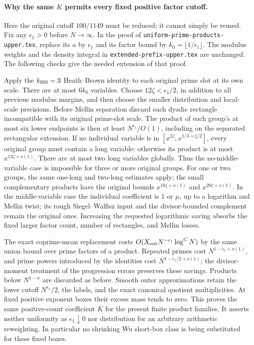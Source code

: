 \paragraph{Why the same $K$ permits every fixed positive factor cutoff.}
Here the original cutoff $100/1149$ must be reduced; it cannot simply
be reused. Fix any $\epsilon_1>0$ before $N\to\infty$. In the proof of
\texttt{uniform-prime-products-upper.tex}, replace its $a$ by
$\epsilon_1$ and its factor bound by $k_0=\lfloor1/\epsilon_1\rfloor$.
The modulus weights and the density integral in
\texttt{extended-prefix-upper.tex} are unchanged. The following checks
give the needed extension of that proof.

Apply the $k_{\rm HB}=3$ Heath--Brown identity to each original prime
slot at its own scale. There are at most $6k_0$ variables. Choose
$12\zeta<\epsilon_1/2$, in addition to all previous modulus margins,
and then choose the smaller distribution and local-scale precisions.
Before Mellin separation discard each dyadic rectangle incompatible
with its original prime-slot scale. The product of each group's at
most six lower endpoints is then at least $N^{\epsilon_1}/O(1)$,
including on the separated rectangular extension. If no individual
variable is in $[x^{2\zeta},x^{1/3+\zeta/2}]$, every original group
must contain a long variable: otherwise its product is at most
$x^{12\zeta+o(1)}$. There are at most two long variables globally.
Thus the no-middle-variable case is impossible for three or more
original groups. For one or two groups, the same one-long and
two-long estimates apply; the small complementary products have
the original bounds $x^{10\zeta+o(1)}$ and $x^{20\zeta+o(1)}$.
In the middle-variable case the individual coefficient is $1$ or
$\mu$, up to a logarithm and Mellin twist; its rough Siegel--Walfisz
input and the divisor-bounded complement remain the original ones.
Increasing the requested logarithmic saving absorbs the fixed larger
factor count, number of rectangles, and Mellin losses.

The exact coprime-mean replacement costs
$O(X_{\rm out}N^{-\epsilon_1}\log^C N)$ by the same union bound over
prime factors of a product. Repeated primes cost
$N^{1-\epsilon_1+o(1)}$, and prime powers introduced by the identities
cost $N^{1-\epsilon_1/2+o(1)}$; the divisor-moment treatment of the
progression errors preserves these savings. Products below
$N^{1-\kappa}$ are discarded as before. Smooth outer approximations
retain the lower cutoff $N^{\epsilon_1}/2$, the labels, and the exact
canonical quotient multiplicities. At fixed positive exponent boxes
their excess mass tends to zero. This proves the same positive-count
coefficient $K$ for the present finite product families. It asserts
neither uniformity as $\epsilon_1\downarrow0$ nor distribution for an
arbitrary arithmetic reweighting. In particular no shrinking Wu
short-box class is being substituted for these fixed boxes.

